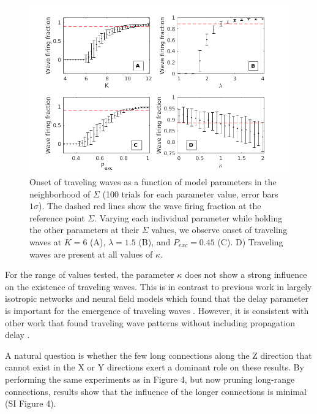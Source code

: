 \documentclass[12pt]{article}
\begin{document}
\begin{figure}[!htb]
 \centering
 \includegraphics[width=\textwidth]{fig/ParamWaveSim}
 \caption{Onset of traveling waves as a function of model parameters in the neighborhood of $\Sigma$ (100 trials for each parameter value, error bars $1\sigma$). 
         The dashed red lines show the wave firing fraction at the \color{red}reference \color{black} point $\Sigma$.  
         Varying each individual parameter while holding the other parameters at their $\Sigma$ values, we observe onset of traveling waves at $K=6$ (A), $\lambda=1.5$ (B), and $P_{exc}=0.45$ (C).  
         D) Traveling waves are present at all values of $\kappa$. }
 \label{fig:wave_parameters}
\end{figure}

\FloatBarrier

For the range of values tested, the parameter $\kappa$ does not show a strong influence on the \color{red}existence \color{black}  of traveling waves. 
\color{red} This is in contrast to previous work in largely isotropic networks and neural field models which found that the delay parameter is important for the emergence of traveling waves \parencite{Senk2020}\parencite{Atay2006}\parencite{Roxin2005}.
However, it is consistent with other work that found traveling wave patterns without including propagation delay \parencite{Folias2012}\parencite{Wyller2007}.

A natural question is whether the few long connections along the Z direction that cannot exist in the X or Y directions exert a dominant role on these results.
By performing the same experiments as in Figure 4, but now pruning long-range connections, results show that the influence of the longer connections is minimal (SI Figure 4).
\color{black}
\end{document}
